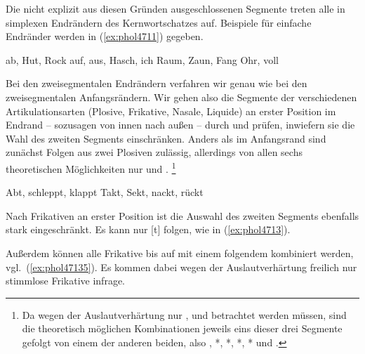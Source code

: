 Die nicht explizit aus diesen Gründen ausgeschlossenen Segmente treten alle in simplexen Endrändern des Kernwortschatzes auf.
Beispiele für einfache Endränder werden in (\ref{ex:phol4711}) gegeben.


\begin{exe}
  \ex\label{ex:phol4711}
  \begin{xlist}
  	\ex ab, Hut, Rock
  	\ex auf, aus, Hasch, ich
  	\ex Raum, Zaun, Fang
  	\ex Ohr, voll
  \end{xlist}
\end{exe}

Bei den zweisegmentalen Endrändern verfahren wir genau wie bei den zweisegmentalen Anfangsrändern.
Wir gehen also die Segmente der verschiedenen Artikulationsarten (Plosive, Frikative, Nasale, Liquide) an erster Position im Endrand -- sozusagen von innen nach außen -- durch und prüfen, inwiefern sie die Wahl des zweiten Segments einschränken.
Anders als im Anfangsrand sind zunächst Folgen aus zwei Plosiven zulässig, allerdings von allen sechs theoretischen Möglichkeiten nur \textipa{[pt]} und \textipa{[kt]}.%
\footnote{Da wegen der Auslautverhärtung nur \textipa{[k]}, \textipa{[t]} und \textipa{[p]} betrachtet werden müssen, sind die theoretisch möglichen Kombinationen jeweils eins dieser drei Segmente gefolgt von einem der anderen beiden, also \textipa{[kt]}, *\textipa{[kp]}, *\textipa{[tk]}, *\textipa{[tp]}, *\textipa{[pk]} und \textipa{[pt]}.}

\begin{exe}
  \ex\label{ex:phol4712}
  \begin{xlist}
  	\ex Abt, schleppt, klappt
  	\ex Takt, Sekt, nackt, rückt
  \end{xlist}
\end{exe}

Nach Frikativen an erster Position ist die Auswahl des zweiten Segments ebenfalls stark eingeschränkt.
Es kann nur [t] folgen, wie in (\ref{ex:phol4713}).

\begin{exe}
\end{exe}

Außerdem können alle Frikative bis auf \textipa{[s]} mit einem folgendem \textipa{[s]} kombiniert werden, vgl.\ (\ref{ex:phol47135}).
Es kommen dabei wegen der Auslautverhärtung freilich nur stimmlose Frikative infrage.

\begin{exe}
\end{exe}

